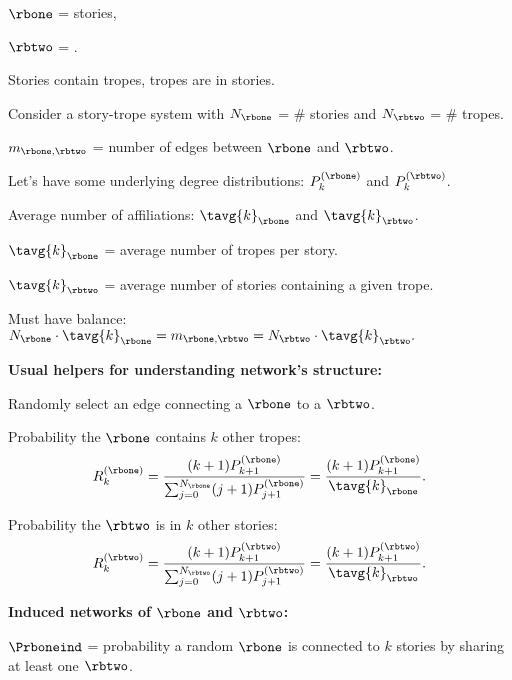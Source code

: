       
        $\rbone$ = stories, 
      
        $\rbtwo$ = .
      
    
      Stories contain tropes, tropes are in stories.
    
      Consider a story-trope system with $N_{\rbone}$ = \# stories and $N_{\rbtwo}$ = \# tropes.
    
      $m_{\rbone,\rbtwo}$ = number of edges between $\rbone$ and $\rbtwo$.
    
      Let's have some underlying degree distributions:
      $P^{(\rbone)}_{k}$
      and
      $P^{(\rbtwo)}_{k}$.
    
      Average number of affiliations:
      $\tavg{k}_{\rbone}$ and $\tavg{k}_{\rbtwo}$.
      
      
        $\tavg{k}_{\rbone}$ = average number of tropes per story.
      
        $\tavg{k}_{\rbtwo}$ = average number of stories containing a given trope.
      
    
      Must have balance:
      $
      N_{\rbone} \cdot \tavg{k}_{\rbone}
      =
      m_{\rbone,\rbtwo}
      =
      N_{\rbtwo} \cdot \tavg{k}_{\rbtwo}.
      $
    
  
  


  \textbf{Usual helpers for understanding network's structure:}
    
     
      Randomly select an edge connecting 
      a $\rbone$ to a $\rbtwo$.
    
      Probability the $\rbone$ contains $k$ other tropes:
      $$
      R^{(\rbone)}_{k}
      =
      \frac{
        (k+1)P^{(\rbone)}_{k+1}
      }
      {
        \sum_{j=0}^{N_\rbone}(j+1)P^{(\rbone)}_{j+1}
      }
      =
      \frac{
        (k+1)P^{(\rbone)}_{k+1}
      }
      {
        \tavg{k}_\rbone
      }.
      $$
    
      Probability the $\rbtwo$ is in $k$ other stories:
      $$
      R^{(\rbtwo)}_{k}
      =
      \frac{
        (k+1)P^{(\rbtwo)}_{k+1}
      }
      {
        \sum_{j=0}^{N_\rbtwo}(j+1)P^{(\rbtwo)}_{j+1}
      }
      =
      \frac{
        (k+1)P^{(\rbtwo)}_{k+1}
      }
      {
        \tavg{k}_\rbtwo
      }.
      $$
    
  



  \textbf{Induced networks of $\rbone$ and $\rbtwo$:}
    
     
      $\Prboneind$ = probability a random $\rbone$ is connected
      to $k$ stories by sharing at least one $\rbtwo$.
     
